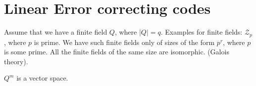 \section{Linear Error correcting codes}

Assume that we have a finite field $Q$, where $|Q| = q$.
Examples for finite fields: $\mathcal{Z}_p$, where $p$ is prime.
We have such finite fields only of sizes of the form $p^r$, where $p$ is some
prime. All the finite fields of the same size are isomorphic. (Galois theory).

$Q^m$ is a vector space.
